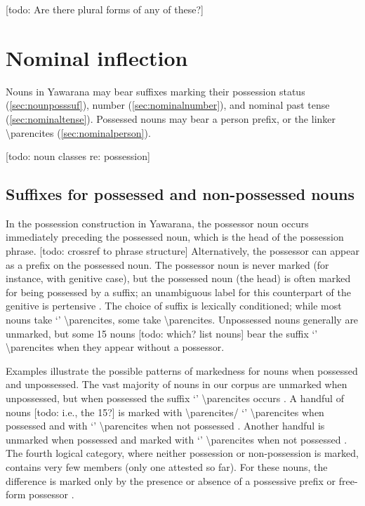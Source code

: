 \documentclass{memoir}
\begin{document}
{[}todo: Are there plural forms of any of these?{]}

\section{\texorpdfstring{Nominal inflection
\label{sec:nouninfl}}{Nominal inflection }}

Nouns in Yawarana may bear suffixes marking their possession status
(\cref{sec:nounposssuf}), number (\cref{sec:nominalnumber}), and nominal
past tense (\cref{sec:nominaltense}). Possessed nouns may bear a person
prefix, or the linker  \textbackslash parencites
(\cref{sec:nominalperson}).

{[}todo: noun classes re: possession{]}

\subsection{\texorpdfstring{Suffixes for possessed and non-possessed
nouns
\label{sec:nounposssuf}}{Suffixes for possessed and non-possessed nouns }}

In the possession construction in Yawarana, the possessor noun occurs
immediately preceding the possessed noun, which is the head of the
possession phrase. {[}todo: crossref to phrase structure{]}
Alternatively, the possessor can appear as a prefix on the possessed
noun. The possessor noun is never marked (for instance, with genitive
case), but the possessed noun (the head) is often marked for being
possessed by a suffix; an unambiguous label for this counterpart of the
genitive is pertensive \parencites{dixon2010basic}. The choice of suffix
is lexically conditioned; while most nouns take  `'
\textbackslash parencites, some take 
\textbackslash parencites. Unpossessed nouns generally are unmarked, but
some 15 nouns {[}todo: which? list nouns{]} bear the suffix 
`' \textbackslash parencites when they appear without a
possessor.

Examples  illustrate the
possible patterns of markedness for nouns when possessed and
unpossessed. The vast majority of nouns in our corpus are unmarked when
unpossessed, but when possessed the suffix  `'
\textbackslash parencites occurs . A handful of
nouns {[}todo: i.e., the 15?{]} is marked with 
\textbackslash parencites/ `'
\textbackslash parencites when possessed and with  `'
\textbackslash parencites when not possessed .
Another handful is unmarked when possessed and marked with 
`' \textbackslash parencites when not possessed
. The fourth logical category, where neither
possession or non-possession is marked, contains very few members (only
one attested so far). For these nouns, the difference is marked only by
the presence or absence of a possessive prefix or free-form possessor
.
\end{document}
